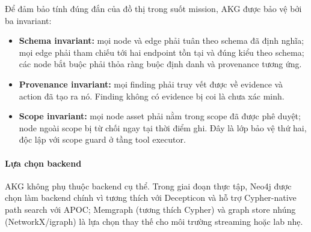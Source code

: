 Để đảm bảo tính đúng đắn của đồ thị trong suốt mission, AKG được bảo vệ bởi ba invariant:

\begin{itemize}
    \item \textbf{Schema invariant:} mọi node và edge phải tuân theo schema đã định nghĩa; mọi edge phải tham chiếu tới hai endpoint tồn tại và đúng kiểu theo schema; các node bắt buộc phải thỏa ràng buộc định danh và provenance tương ứng.
    \item \textbf{Provenance invariant:} mọi finding phải truy vết được về evidence và action đã tạo ra nó. Finding không có evidence bị coi là chưa xác minh.
    \item \textbf{Scope invariant:} mọi node asset phải nằm trong scope đã được phê duyệt; node ngoài scope bị từ chối ngay tại thời điểm ghi. Đây là lớp bảo vệ thứ hai, độc lập với scope guard ở tầng tool executor.
\end{itemize}

\paragraph{Lựa chọn backend}

AKG không phụ thuộc backend cụ thể. Trong giai đoạn thực tập, Neo4j được chọn làm backend chính vì tương thích với Decepticon và hỗ trợ Cypher-native path search với APOC; Memgraph (tương thích Cypher) và graph store nhúng (NetworkX/igraph) là lựa chọn thay thế cho môi trường streaming hoặc lab nhẹ.